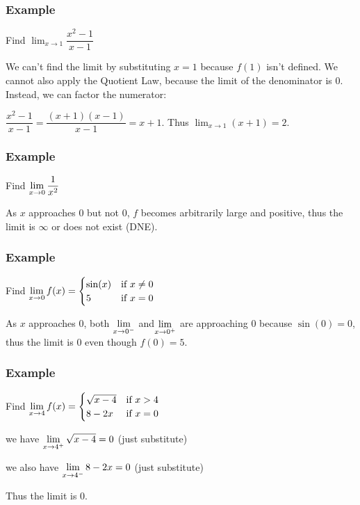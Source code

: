 \documentclass[t]{beamer}
\theoremstyle{plain}
\theoremstyle{definition}
\newcommand{\ds}{\displaystyle}
\newcommand{\disp}{\displaystyle}
\newcommand{\limm}[1]{\displaystyle \lim_{x\to #1}}
\begin{document}
\frame
{
	\frametitle{Example}

Find $\disp{\lim_{x\to 1}} {\dfrac{x^2-1}{x-1}}$

\vspace{3em}

We can't find the limit by substituting $x = 1$ because $f(1)$ isn't defined.  We cannot also apply the Quotient Law,  because the limit of the denominator is 0.  Instead, we can factor the numerator:

${\dfrac{x^2-1}{x-1}=\dfrac{(x+1)(x-1)}{x-1}}= x+1$. Thus 
$\disp{\lim_{x\to 1} (x+1) = 2.}$
}



\frame
{
	\frametitle{Example}

Find $\ds\limm{0}\dfrac{1}{x^2}$

\vspace{3em}

As $x$ approaches 0 but not 0,  $f$ becomes arbitrarily large and positive, thus the limit is $\infty$ or does not exist (DNE).

}

\frame
{
	\frametitle{Example}

Find  $\ds\limm{0}f(x)=\begin{cases}
\sin(x)&\mbox{if }x\neq 0\\
5&\mbox{if }x=0
      \end{cases}$

\vspace{3em}

As $x$ approaches 0, both $\ds\limm{0^-}$ and$\ds\limm{0^+}$ are approaching 0 because $\sin(0) = 0$, thus the limit is 0 even though $f(0) = 5$.

}

\frame
{
	\frametitle{Example}

Find   $\ds\limm{4}f(x)=\begin{cases}
\sqrt{x - 4}&\mbox{if }x > 4\\
8 - 2x&\mbox{if }x=0
      \end{cases}$

\vspace{3em}

we have $\ds\limm{4^+} \sqrt{x-4} = 0$ (just substitute)

\vspace{1em}

we also have $\ds\limm{4^-} 8 - 2x = 0$  (just substitute)

\vspace{1em}

Thus the limit is 0.

}
\end{document}
